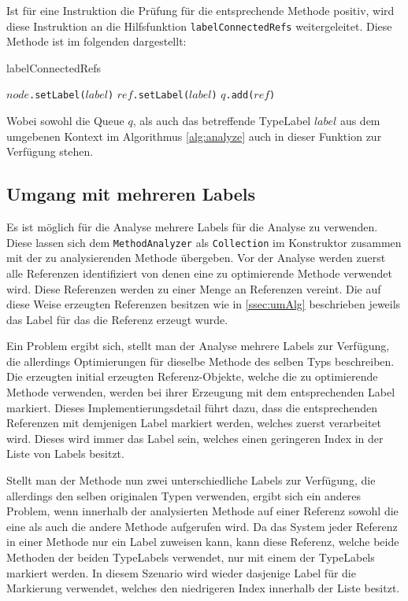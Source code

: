 Ist für eine Instruktion die Prüfung für die entsprechende Methode positiv, wird diese 
Instruktion an die Hilfsfunktion \texttt{labelConnectedRefs} weitergeleitet. Diese Methode 
ist im folgenden dargestellt:

\begin{algorithm}[H]
	\caption{labelConnectedRefs}\label{alg:labelConnRefs}
	\begin{algorithmic}[1]
		\STATE \texttt{$node$.setLabel($label$)}
				\STATE \texttt{$ref$.setLabel($label$)}
				\STATE \texttt{$q$.add($ref$)}
			\ENDIF 
		\ENDFOR
	\end{algorithmic}
\end{algorithm}

Wobei sowohl die Queue $q$, als auch das betreffende TypeLabel $label$ aus dem umgebenen Kontext
im Algorithmus \ref{alg:analyze} auch in dieser Funktion zur Verfügung stehen. 

\subsection{Umgang mit mehreren Labels}

Es ist möglich für die Analyse mehrere Labels für die Analyse zu verwenden. Diese lassen
sich dem \texttt{MethodAnalyzer} als \texttt{Collection} im Konstruktor zusammen 
mit der zu analysierenden Methode übergeben. Vor der Analyse werden zuerst alle Referenzen 
identifiziert von denen eine zu optimierende Methode verwendet wird. Diese Referenzen werden 
zu einer Menge an Referenzen vereint. Die auf diese Weise erzeugten Referenzen besitzen 
wie in \ref{ssec:umAlg} beschrieben jeweils das Label für das die Referenz erzeugt wurde.

Ein Problem ergibt sich, stellt man der Analyse mehrere Labels zur Verfügung, die allerdings
Optimierungen für dieselbe Methode des selben Typs beschreiben. Die erzeugten initial erzeugten 
Referenz-Objekte, welche die zu optimierende Methode verwenden, werden bei ihrer Erzeugung
mit dem entsprechenden Label markiert. Dieses Implementierungsdetail führt dazu, dass 
die entsprechenden Referenzen mit demjenigen Label markiert werden, welches zuerst verarbeitet wird.
Dieses wird immer das Label sein, welches einen geringeren Index in der Liste von Labels 
besitzt. 

Stellt man der Methode nun zwei unterschiedliche Labels zur Verfügung, die allerdings den
selben originalen Typen verwenden, ergibt sich ein anderes Problem, wenn innerhalb der analysierten 
Methode auf einer Referenz sowohl die eine als auch die andere Methode aufgerufen wird. Da das 
System jeder Referenz in einer Methode nur ein Label zuweisen kann, kann diese Referenz, welche 
beide Methoden der beiden TypeLabels verwendet, nur mit einem der TypeLabels markiert werden. 
In diesem Szenario wird wieder dasjenige Label für die Markierung verwendet, welches den niedrigeren
Index innerhalb der Liste besitzt.

